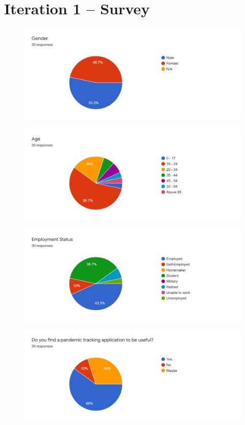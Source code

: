 \section{Iteration 1 – Survey} \label{appendix:survey}

  \begin{figure}[H]
    \centering
    \includegraphics[width=\linewidth]{img/Survey/Q1.png}
  \end{figure}
  \begin{figure}[H]
    \centering
    \includegraphics[width=\linewidth]{img/Survey/Q2.png}
  \end{figure}
  \begin{figure}[H]
    \centering
    \includegraphics[width=\linewidth]{img/Survey/Q3.png}
  \end{figure}
  \begin{figure}[H]
    \centering
    \includegraphics[width=\linewidth]{img/Survey/Q4.png}
  \end{figure}
